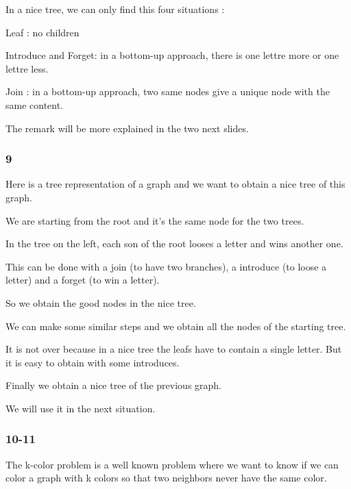 \documentclass[a4paper, 10pt,french,landscape]{article}
\begin{document}
\begin{multicols}{3}
In a nice tree, we can only find this four situations : 

Leaf : no children

Introduce and Forget: in a bottom-up approach, there is one lettre more or one lettre less.

Join : in a bottom-up approach, two same nodes give a unique node with the same content.

The remark will be more explained in the two next slides. 



\subsubsection*{ 9}

Here is a tree representation of a graph and we want to obtain a nice tree of this graph.


We are starting from the root and it's the same node for the two trees.

In the tree on the left, each son of the root looses a letter and wins another one.

 This can be done with a join (to have two branches), a introduce (to loose a letter) and a forget (to win a letter). 
 
 So we obtain the good nodes in the nice tree.

We can make some similar steps and we obtain all the nodes of the starting tree.

It is not over because in a nice tree the leafs have to contain a single letter. But it is easy  to obtain with some introduces.

Finally we obtain a nice tree of the previous graph. 

We will use it in the next situation.



\subsubsection*{ 10-11}




The k-color problem is a well known problem where we want to know if we can color a graph with k colors so that two neighbors never have the same color.


\end{multicols}
\end{document}

